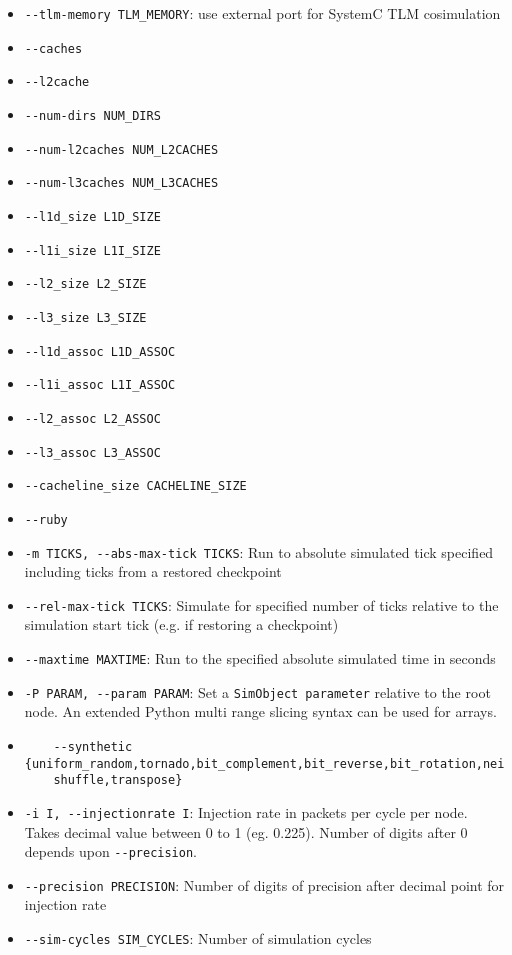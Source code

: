 \documentclass{article}
\begin{document}
\begin{itemize}
	\item \verb|--tlm-memory TLM_MEMORY|: use external port for SystemC TLM cosimulation
	\item \verb|--caches|
	\item \verb|--l2cache|
	\item \verb|--num-dirs NUM_DIRS|
	\item \verb|--num-l2caches NUM_L2CACHES|
	\item \verb|--num-l3caches NUM_L3CACHES|
	\item \verb|--l1d_size L1D_SIZE|
	\item \verb|--l1i_size L1I_SIZE|
	\item \verb|--l2_size L2_SIZE|
	\item \verb|--l3_size L3_SIZE|
	\item \verb|--l1d_assoc L1D_ASSOC|
	\item \verb|--l1i_assoc L1I_ASSOC|
	\item \verb|--l2_assoc L2_ASSOC|
	\item \verb|--l3_assoc L3_ASSOC|
	\item \verb|--cacheline_size CACHELINE_SIZE|
	\item \verb|--ruby|
	\item \verb|-m TICKS, --abs-max-tick TICKS|: Run to absolute simulated tick specified including ticks from a restored checkpoint
	\item \verb|--rel-max-tick TICKS|: Simulate for specified number of ticks relative to the simulation start tick (e.g. if restoring a checkpoint)
	\item \verb|--maxtime MAXTIME|: Run to the specified absolute simulated time in seconds
	\item \verb|-P PARAM, --param PARAM|: Set a \verb|SimObject parameter| relative to the root node. An extended Python multi range slicing syntax can be used for arrays.
	\item \begin{verbatim}
	--synthetic {uniform_random,tornado,bit_complement,bit_reverse,bit_rotation,neighbor,
	shuffle,transpose}\end{verbatim}
	\item \verb|-i I, --injectionrate I|: Injection rate in packets per cycle per node. Takes decimal value between 0 to 1 (eg. 0.225). Number of digits after 0 depends upon \verb|--precision|.
	\item \verb|--precision PRECISION|: Number of digits of precision after decimal point for injection rate
	\item \verb|--sim-cycles SIM_CYCLES|: Number of simulation cycles

\end{itemize}
\end{document}
